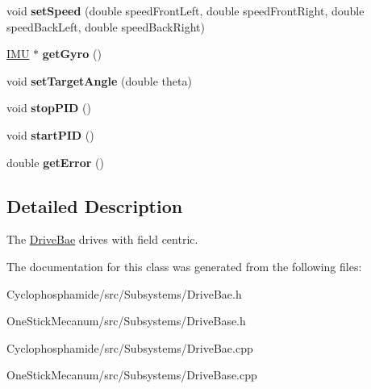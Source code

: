 \begin{DoxyCompactItemize}
\item 
\hypertarget{class_drive_bae_a1d381de7dfb03bd3dd138a889c01e880}{}void {\bfseries set\+Speed} (double speed\+Front\+Left, double speed\+Front\+Right, double speed\+Back\+Left, double speed\+Back\+Right)\label{class_drive_bae_a1d381de7dfb03bd3dd138a889c01e880}

\item 
\hypertarget{class_drive_bae_a39bbf7738c0574681d27778543f7d621}{}\hyperlink{class_i_m_u}{I\+M\+U} $\ast$ {\bfseries get\+Gyro} ()\label{class_drive_bae_a39bbf7738c0574681d27778543f7d621}

\item 
\hypertarget{class_drive_bae_a489a12b403e0b818083402007ea2e314}{}void {\bfseries set\+Target\+Angle} (double theta)\label{class_drive_bae_a489a12b403e0b818083402007ea2e314}

\item 
\hypertarget{class_drive_bae_a4c2778dabdaa81abd29eb9330222f151}{}void {\bfseries stop\+P\+I\+D} ()\label{class_drive_bae_a4c2778dabdaa81abd29eb9330222f151}

\item 
\hypertarget{class_drive_bae_af990ac05d3821371b351b7e60055177e}{}void {\bfseries start\+P\+I\+D} ()\label{class_drive_bae_af990ac05d3821371b351b7e60055177e}

\item 
\hypertarget{class_drive_bae_a813f9dfbe7bf7691de735c74e88548d2}{}double {\bfseries get\+Error} ()\label{class_drive_bae_a813f9dfbe7bf7691de735c74e88548d2}

\end{DoxyCompactItemize}


\subsection{Detailed Description}
The \hyperlink{class_drive_bae}{Drive\+Bae} drives with field centric. 

The documentation for this class was generated from the following files\+:\begin{DoxyCompactItemize}
\item 
Cyclophosphamide/src/\+Subsystems/Drive\+Bae.\+h\item 
One\+Stick\+Mecanum/src/\+Subsystems/Drive\+Base.\+h\item 
Cyclophosphamide/src/\+Subsystems/Drive\+Bae.\+cpp\item 
One\+Stick\+Mecanum/src/\+Subsystems/Drive\+Base.\+cpp\end{DoxyCompactItemize}
